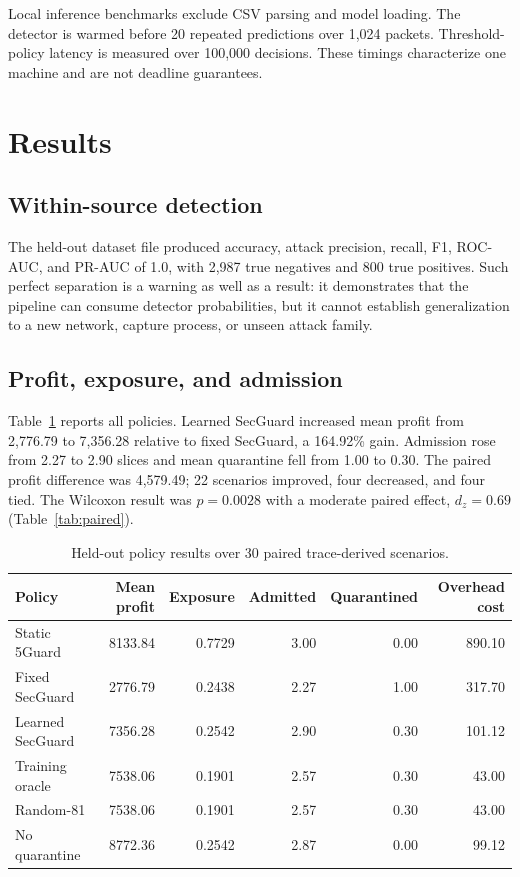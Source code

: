 \documentclass[conference]{IEEEtran}
\begin{document}
Local inference benchmarks exclude CSV parsing and model loading. The detector
is warmed before 20 repeated predictions over 1,024 packets. Threshold-policy
latency is measured over 100,000 decisions. These timings characterize one
machine and are not deadline guarantees.

\section{Results}
\subsection{Within-source detection}
The held-out dataset file produced accuracy, attack precision, recall, F1,
ROC-AUC, and PR-AUC of 1.0, with 2,987 true negatives and 800 true positives.
Such perfect separation is a warning as well as a result: it demonstrates that
the pipeline can consume detector probabilities, but it cannot establish
generalization to a new network, capture process, or unseen attack family.

\subsection{Profit, exposure, and admission}
Table~\ref{tab:policy-results} reports all policies. Learned SecGuard increased
mean profit from 2,776.79 to 7,356.28 relative to fixed SecGuard, a 164.92\%
gain. Admission rose from 2.27 to 2.90 slices and mean quarantine fell from 1.00
to 0.30. The paired profit difference was 4,579.49; 22 scenarios improved, four
decreased, and four tied. The Wilcoxon result was $p=0.0028$ with a moderate
paired effect, $d_z=0.69$ (Table~\ref{tab:paired}).

\begin{table}[t]
\centering
\caption{Held-out policy results over 30 paired trace-derived scenarios.}
\label{tab:policy-results}
\begin{tabular}{lrrrrr}
\toprule
Policy & Mean profit & Exposure & Admitted & Quarantined & Overhead cost \\
\midrule
Static 5Guard & 8133.84 & 0.7729 & 3.00 & 0.00 & 890.10 \\
Fixed SecGuard & 2776.79 & 0.2438 & 2.27 & 1.00 & 317.70 \\
Learned SecGuard & 7356.28 & 0.2542 & 2.90 & 0.30 & 101.12 \\
Training oracle & 7538.06 & 0.1901 & 2.57 & 0.30 & 43.00 \\
Random-81 & 7538.06 & 0.1901 & 2.57 & 0.30 & 43.00 \\
No quarantine & 8772.36 & 0.2542 & 2.87 & 0.00 & 99.12 \\
\bottomrule
\end{tabular}
\end{table}
\end{document}
